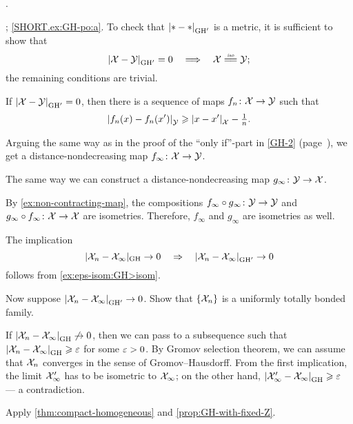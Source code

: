  \cite[Exercises 7.5.13 and 7.5.17]{burago-burago-ivanov}. 

\parbf{\ref{ex:GH-po}}; \ref{SHORT.ex:GH-po:a}.
To check that $\dist{*}{*}{\GH'}$ is a metric, it is sufficient to show that
\[\dist{\spc{X}}{\spc{Y}}{\GH'}=0 
\quad\Longrightarrow\quad
\spc{X}\iso\spc{Y};\]
the remaining conditions are trivial.

If $\dist{\spc{X}}{\spc{Y}}{\GH'}=0$, then there is a sequence of maps $f_n\colon\mathcal{X}\to \mathcal{Y}$ such that 
\[\dist{f_n(x)}{f_n(x')}{\spc{Y}}\ge \dist{x}{x'}{\spc{X}}-\tfrac1n.\]

Arguing the same way as in the proof of the ``only if''-part in \ref{GH-2} (page~\pageref{page:GH-2-proof}),
we get a distance-nondecreasing map $f_\infty\colon\mathcal{X}\to \mathcal{Y}$.

The same way we can construct a distance-nondecreasing map 
$g_\infty\colon\mathcal{Y}\to \mathcal{X}$.

By \ref{ex:non-contracting-map}, the compositions $f_\infty\circ g_\infty\colon\mathcal{Y}\to \mathcal{Y}$ and $g_\infty\z\circ f_\infty\:\spc{X}\to \spc{X}$ are isometries.
Therefore, $f_\infty$ and $g_\infty$ are isometries as well.

 The implication 
\[|\spc{X}_n-\spc{X}_\infty|_{\GH}\to 0 
\quad\Rightarrow\quad 
\dist{\spc{X}_n}{\spc{X}_\infty}{\GH'}\to 0\]
follows from \ref{ex:eps-isom:GH>isom}. 

Now suppose $\dist{\spc{X}_n}{\spc{X}_\infty}{\GH'}\to 0$.
Show that $\{\mathcal{X}_n\}$ is a uniformly totally bonded family.

If $\dist{\spc{X}_n}{\spc{X}_\infty}{\GH}\not\to 0$, then we can pass to a subsequence such that $\dist{\spc{X}_n}{\spc{X}_\infty}{\GH}\ge\eps$ for some $\varepsilon>0$.
By Gromov selection theorem, we can assume that $\mathcal{X}_n$ converges in the sense of Gromov--Hausdorff.
From the first implication, the limit $\mathcal{X}_\infty'$ has to be isometric to $\mathcal{X}_\infty$;
on the other hand, $\dist{\spc{X}_\infty'}{\spc{X}_\infty}{\GH}\ge \eps$ --- a contradiction.

Apply \ref{thm:compact-homogeneous} and \ref{prop:GH-with-fixed-Z}.

